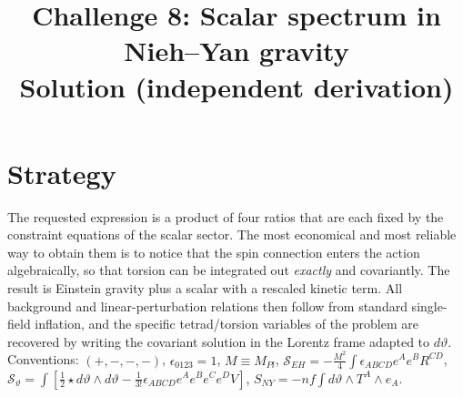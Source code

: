 \documentclass[11pt]{article}
\title{Challenge 8: Scalar spectrum in Nieh--Yan gravity \\ \large Solution (independent derivation)}
\date{}
\begin{document}
\maketitle

\section{Strategy}
The requested expression is a product of four ratios that are each fixed by the constraint equations of the scalar sector. The most economical and most reliable way to obtain them is to notice that the spin connection enters the action algebraically, so that torsion can be integrated out \emph{exactly} and covariantly. The result is Einstein gravity plus a scalar with a rescaled kinetic term. All background and linear-perturbation relations then follow from standard single-field inflation, and the specific tetrad/torsion variables of the problem are recovered by writing the covariant solution in the Lorentz frame adapted to $d\vartheta$. Conventions: $(+,-,-,-)$, $\epsilon_{0123}=1$, $M\equiv M_{Pl}$, $\mathcal S_{EH}=-\frac{M^2}{4}\int\epsilon_{ABCD}e^Ae^BR^{CD}$, $\mathcal S_\vartheta=\int[\frac12\star d\vartheta\wedge d\vartheta-\frac{1}{3!}\epsilon_{ABCD}e^Ae^Be^Ce^DV]$, $S_{NY}=-nf\int d\vartheta\wedge T^A\wedge e_A$.
\end{document}
